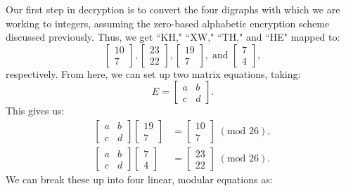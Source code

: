 \documentclass{article}
\begin{document}
\noindent Our first step in decryption is to convert the four digraphs with which we are working to integers, assuming the zero-based alphabetic encryption scheme discussed previously. Thus, we get ``KH," ``XW," ``TH," and ``HE" mapped to:
\[
    \begin{bmatrix}
        10 \\
        7
    \end{bmatrix},
    \begin{bmatrix}
        23 \\
        22
    \end{bmatrix},
    \begin{bmatrix}
        19 \\
        7
    \end{bmatrix}, \; \text{and }
    \begin{bmatrix}
        7 \\
        4
    \end{bmatrix},
\]
respectively. From here, we can set up two matrix equations, taking:
\[
    E = \begin{bmatrix}
        a & b \\
        c & d
    \end{bmatrix}.
\]
This gives us:
\begin{align*}
    \begin{bmatrix}
        a & b \\
        c & d
    \end{bmatrix} \begin{bmatrix}
        19 \\
        7
    \end{bmatrix} &= \begin{bmatrix}
        10 \\
        7
    \end{bmatrix} \; (\text{mod } 26), \\
    \begin{bmatrix}
        a & b \\
        c & d
    \end{bmatrix} \begin{bmatrix}
        7 \\
        4
    \end{bmatrix} &= \begin{bmatrix}
        23 \\
        22
    \end{bmatrix} \; (\text{mod } 26).
\end{align*}
We can break these up into four linear, modular equations as:
\end{document}
